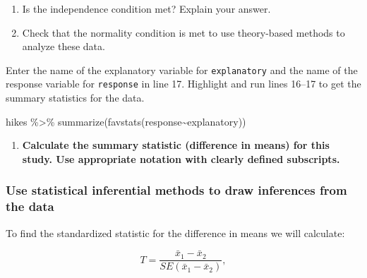 \documentclass[
]{report}
\newenvironment{Shaded}{\begin{snugshade}}{\end{snugshade}}
\newcommand{\FunctionTok}[1]{\textcolor[rgb]{0.00,0.00,0.00}{#1}}
\newcommand{\NormalTok}[1]{#1}
\newcommand{\SpecialCharTok}[1]{\textcolor[rgb]{0.00,0.00,0.00}{#1}}
\providecommand{\tightlist}{%
  \setlength{\itemsep}{0pt}\setlength{\parskip}{0pt}}
\begin{document}
\begin{enumerate}
\def\labelenumi{\arabic{enumi}.}
\setcounter{enumi}{3}
\item
  Is the independence condition met? Explain your answer.
  \vspace{0.8in}
\item
  Check that the normality condition is met to use theory-based methods to analyze these data.
\end{enumerate}

\vspace{0.8in}

\newpage

Enter the name of the explanatory variable for \texttt{explanatory} and the name of the response variable for \texttt{response} in line 17. Highlight and run lines 16--17 to get the summary statistics for the data.

\begin{Shaded}
\begin{Highlighting}[]
\NormalTok{hikes }\SpecialCharTok{\%\textgreater{}\%}
  \FunctionTok{summarize}\NormalTok{(}\FunctionTok{favstats}\NormalTok{(response}\SpecialCharTok{\textasciitilde{}}\NormalTok{explanatory))}
\end{Highlighting}
\end{Shaded}

\begin{enumerate}
\def\labelenumi{\arabic{enumi}.}
\setcounter{enumi}{5}
\tightlist
\item
  \textbf{Calculate the summary statistic (difference in means) for this study. Use appropriate notation with clearly defined subscripts.}
\end{enumerate}

\vspace{1in}

\hypertarget{use-statistical-inferential-methods-to-draw-inferences-from-the-data-4}{%
\subsubsection*{Use statistical inferential methods to draw inferences from the data}\label{use-statistical-inferential-methods-to-draw-inferences-from-the-data-4}}

To find the standardized statistic for the difference in means we will calculate:

\[T = \frac{\bar{x}_1-\bar{x}_2}{SE(\bar{x}_1-\bar{x}_2)},\]
\end{document}
